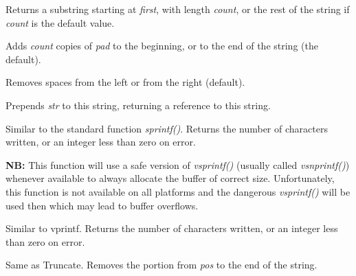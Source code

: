 \label{wxstringmid}


Returns a substring starting at {\it first}, with length {\it count}, or the rest of
the string if {\it count} is the default value.

\label{wxstringpad}


Adds {\it count} copies of {\it pad} to the beginning, or to the end of the string (the default).

Removes spaces from the left or from the right (default).

\label{wxstringprepend}


Prepends {\it str} to this string, returning a reference to this string.

\label{wxstringprintf}


Similar to the standard function {\it sprintf()}. Returns the number of
characters written, or an integer less than zero on error.

{\bf NB:} This function will use a safe version of {\it vsprintf()} (usually called 
{\it vsnprintf()}) whenever available to always allocate the buffer of correct
size. Unfortunately, this function is not available on all platforms and the
dangerous {\it vsprintf()} will be used then which may lead to buffer overflows.

\label{wxstringprintfv}


Similar to vprintf. Returns the number of characters written, or an integer less than zero
on error.

\label{wxstringremove}


Same as Truncate. Removes the portion from {\it pos} to the end of the string.


